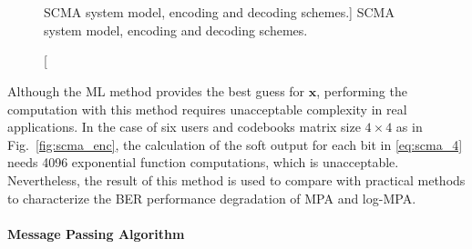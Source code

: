 \begin{figure}[htp]
  \centering
  \\
  \\
  \quad
  \caption
    [SCMA system model, encoding and decoding schemes.]
    {SCMA system model, encoding and decoding schemes.}
  \label{fig:scma}
\end{figure}

Although the ML method provides the best guess for $\bm{\hat{x}}$, performing
the computation with this method requires unacceptable complexity in real
applications. In the case of six users and codebooks matrix size $4\times4$ as
in Fig.~\ref{fig:scma_enc}, the calculation of the soft output for each bit
in \eqref{eq:scma_4} needs 4096 exponential function computations, which is
unacceptable. Nevertheless, the result of this method is used to compare with
practical methods to characterize the BER performance degradation of MPA and
log-MPA.

\paragraph{Message Passing Algorithm}
\label{sec:scma_mpa}

